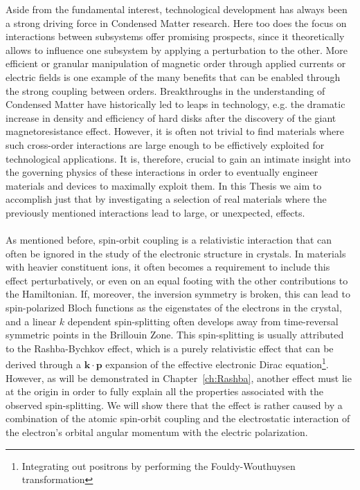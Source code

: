 Aside from the fundamental interest, technological development has always been a strong driving force in Condensed Matter research. Here too does the focus on interactions between subsystems offer promising prospects, since it theoretically allows to influence one subsystem by applying a perturbation to the other.
More efficient or granular manipulation of magnetic order through applied currents or electric fields is one example of the many benefits that can be enabled through the strong coupling between orders.
Breakthroughs in the understanding of Condensed Matter have historically led to leaps in technology, e.g. the dramatic increase in density and efficiency of hard disks after the discovery of the giant magnetoresistance effect.
However, it is often not trivial to find materials where such cross-order interactions are large enough to be effictively exploited for technological applications.
It is, therefore, crucial to gain an intimate insight into the governing physics of these interactions in order to eventually engineer materials and devices to maximally exploit them.
In this Thesis we aim to accomplish just that by investigating a selection of real materials where the previously mentioned interactions lead to large, or unexpected, effects.
\\\\
As mentioned before, spin-orbit coupling is a relativistic interaction that can often be ignored in the study of the electronic structure in crystals.
In materials with heavier constituent ions, it often becomes a requirement to include this effect perturbatively, or even on an equal footing with the other contributions to the Hamiltonian.
If, moreover, the inversion symmetry is broken, this can lead to spin-polarized Bloch functions as the eigenstates of the electrons in the crystal, and a linear $k$ dependent spin-splitting often develops away from time-reversal symmetric points in the Brillouin Zone.
This spin-splitting is usually attributed to the Rashba-Bychkov effect, which is a purely relativistic effect that can be derived through a $\bm{k}\cdot \bm{p}$ expansion of the effective electronic Dirac equation\footnote{Integrating out positrons by performing the Fouldy-Wouthuysen transformation}.
However, as will be demonstrated in Chapter~\ref{ch:Rashba}, another effect must lie at the origin in order to fully explain  all the properties associated with the observed spin-splitting.
We will show there that the effect is rather caused by a combination of the atomic spin-orbit coupling and the electrostatic interaction of the electron's orbital angular momentum with the electric polarization.
